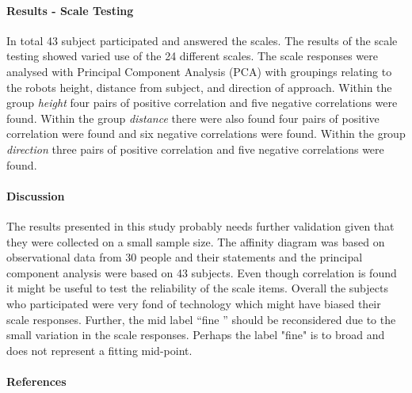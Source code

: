\documentclass[a4paper]{article}
\begin{document}
\paragraph{Results - Scale Testing}
In total 43 subject participated and answered the scales. The results of the scale testing showed varied use of the 24 different scales. The scale responses were analysed with Principal Component Analysis (PCA) with groupings relating to the robots height, distance from subject, and direction of approach. Within the group \textit{height} four pairs of positive correlation and five negative correlations were found. Within the group \textit{distance} there were also found four pairs of positive correlation were found and six negative correlations were found. Within the group \textit{direction} three pairs of positive correlation and five negative correlations were found. 

\paragraph{Discussion}
The results presented in this study probably needs further validation given that they were collected on a small sample size. The affinity diagram was based on observational data from 30 people and their statements and the principal component analysis  were based on 43 subjects. Even though correlation is found it might be useful to test the reliability of the scale items. Overall the subjects who participated were very fond of technology which might have biased their scale responses. Further, the mid label ``fine '' should be reconsidered due to the small variation in the scale responses. Perhaps the label "fine" is to broad and does not represent a fitting mid-point. 

\paragraph{References}
\end{document}
